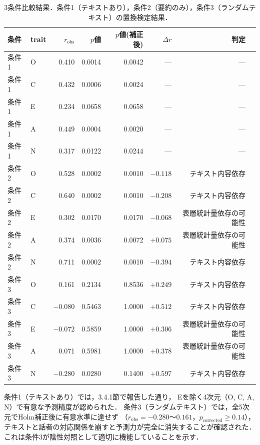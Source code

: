 \documentclass[dvipdfmx,11pt,a4paper]{bxjsarticle}
\renewcommand{\_}{\paperorigunderscore\allowbreak}%
\begin{document}
\begin{table}[htbp]
\centering
\caption{3条件比較結果．条件1（テキストあり），条件2（要約のみ），条件3（ランダムテキスト）の置換検定結果．}
\label{tab:baseline_comparison}
\begin{tabular}{llrrrrrl}
\toprule
条件 & trait & $r_{\text{obs}}$ & $p$値 & $p$値(補正後) & $\Delta r$ & 判定 \\
\midrule
条件1 & O & 0.410 & 0.0014 & 0.0042 & --- & --- \\
条件1 & C & 0.432 & 0.0006 & 0.0024 & --- & --- \\
条件1 & E & 0.234 & 0.0658 & 0.0658 & --- & --- \\
条件1 & A & 0.449 & 0.0004 & 0.0020 & --- & --- \\
条件1 & N & 0.317 & 0.0122 & 0.0244 & --- & --- \\
\midrule
条件2 & O & 0.528 & 0.0002 & 0.0010 & $-0.118$ & テキスト内容依存 \\
条件2 & C & 0.640 & 0.0002 & 0.0010 & $-0.208$ & テキスト内容依存 \\
条件2 & E & 0.302 & 0.0170 & 0.0170 & $-0.068$ & 表層統計量依存の可能性 \\
条件2 & A & 0.374 & 0.0036 & 0.0072 & $+0.075$ & 表層統計量依存の可能性 \\
条件2 & N & 0.711 & 0.0002 & 0.0010 & $-0.394$ & テキスト内容依存 \\
\midrule
条件3 & O & 0.161 & 0.2134 & 0.8536 & $+0.249$ & テキスト内容依存 \\
条件3 & C & $-0.080$ & 0.5463 & 1.0000 & $+0.512$ & テキスト内容依存 \\
条件3 & E & $-0.072$ & 0.5859 & 1.0000 & $+0.306$ & 表層統計量依存の可能性 \\
条件3 & A & 0.071 & 0.5981 & 1.0000 & $+0.378$ & 表層統計量依存の可能性 \\
条件3 & N & $-0.280$ & 0.0280 & 0.1400 & $+0.597$ & テキスト内容依存 \\
\bottomrule
\end{tabular}
\end{table}

条件1（テキストあり）では，3.4.1節で報告した通り，
Eを除く4次元（O, C, A, N）で有意な予測精度が認められた．
条件3（ランダムテキスト）では，全5次元でHolm補正後に有意水準に達せず
（$r_{\text{obs}} = -0.280$〜$0.161$，$p_{\text{corrected}} \geq 0.14$），
テキストと話者の対応関係を崩すと予測力が完全に消失することが確認された．
これは条件3が陰性対照として適切に機能していることを示す．
\end{document}
